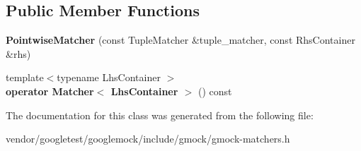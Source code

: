 \subsection*{Public Member Functions}
\begin{DoxyCompactItemize}
\item 
{\bfseries Pointwise\+Matcher} (const Tuple\+Matcher \&tuple\+\_\+matcher, const Rhs\+Container \&rhs)\hypertarget{classtesting_1_1internal_1_1PointwiseMatcher_aa6e63218a93062d5055428462417821f}{}\label{classtesting_1_1internal_1_1PointwiseMatcher_aa6e63218a93062d5055428462417821f}

\item 
{\footnotesize template$<$typename Lhs\+Container $>$ }\\{\bfseries operator Matcher$<$ Lhs\+Container $>$} () const \hypertarget{classtesting_1_1internal_1_1PointwiseMatcher_a2b2a6dd426a983e556b57af8d4f7928f}{}\label{classtesting_1_1internal_1_1PointwiseMatcher_a2b2a6dd426a983e556b57af8d4f7928f}

\end{DoxyCompactItemize}


The documentation for this class was generated from the following file\+:\begin{DoxyCompactItemize}
\item 
vendor/googletest/googlemock/include/gmock/gmock-\/matchers.\+h\end{DoxyCompactItemize}
